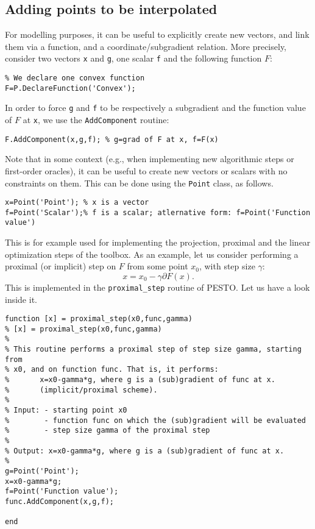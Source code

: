 \documentclass[11pt,a4paper]{article}
\begin{document}
\subsection{Adding points to be interpolated}
For modelling purposes, it can be useful to explicitly create new vectors, and link them via a function, and a coordinate/subgradient relation. More precisely, consider two vectors \verb?x? and \verb?g?, one scalar \verb?f? and the following function $F$:\\[-1cm]
\begin{lstlisting}
% We declare one convex function
F=P.DeclareFunction('Convex');
\end{lstlisting}
In order to force \verb?g? and \verb?f? to be respectively a subgradient and the function value of $F$ at \verb?x?, we use the \verb?AddComponent? routine:\\[-1cm]
\begin{lstlisting}
F.AddComponent(x,g,f); % g=grad of F at x, f=F(x)
\end{lstlisting}
Note that in some context (e.g., when implementing new algorithmic steps or first-order oracles), it can be useful to create new vectors or scalars with no constraints on them. This can be done using the \verb?Point? class, as follows.\\[-1cm]
\begin{lstlisting}
x=Point('Point'); % x is a vector
f=Point('Scalar');% f is a scalar; atlernative form: f=Point('Function value')
\end{lstlisting}
This is for example used for implementing the projection, proximal and the linear optimization steps of the toolbox. As an example, let us consider performing a proximal (or implicit) step on $F$ from some point $x_0$, with step size $\gamma$:
\[x=x_0-\gamma \partial F(x).\]
This is implemented in the \verb?proximal_step? routine of PESTO. Let us have a look inside it.
\begin{lstlisting}
function [x] = proximal_step(x0,func,gamma)
% [x] = proximal_step(x0,func,gamma)
%
% This routine performs a proximal step of step size gamma, starting from
% x0, and on function func. That is, it performs:
%       x=x0-gamma*g, where g is a (sub)gradient of func at x.
%       (implicit/proximal scheme).
%
% Input: - starting point x0
%        - function func on which the (sub)gradient will be evaluated
%        - step size gamma of the proximal step
%
% Output: x=x0-gamma*g, where g is a (sub)gradient of func at x.
%
g=Point('Point');
x=x0-gamma*g;
f=Point('Function value');
func.AddComponent(x,g,f);

end
\end{lstlisting}
\end{document}
